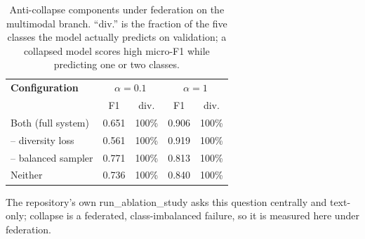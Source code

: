 \begin{table}[t]
\caption{Anti-collapse components under federation on the multimodal branch. ``div.'' is the fraction of the five classes the model actually predicts on validation; a collapsed model scores high micro-F1 while predicting one or two classes.}
\label{tab:anticollapse}
\centering\footnotesize
\setlength\tabcolsep{5pt}
\begin{tabular}{lcccc}
\toprule
\textbf{Configuration} & \multicolumn{2}{c}{$\alpha=0.1$} & \multicolumn{2}{c}{$\alpha=1$}\\
 & F1 & div. & F1 & div.\\
\midrule
Both (full system) & 0.651 & 100\% & 0.906 & 100\% \\
-- diversity loss & 0.561 & 100\% & 0.919 & 100\% \\
-- balanced sampler & 0.771 & 100\% & 0.813 & 100\% \\
Neither & 0.736 & 100\% & 0.840 & 100\% \\
\bottomrule
\end{tabular}
\vspace{1pt}

{\scriptsize The repository's own run\_ablation\_study asks this question centrally and text-only; collapse is a federated, class-imbalanced failure, so it is measured here under federation.}
\end{table}
